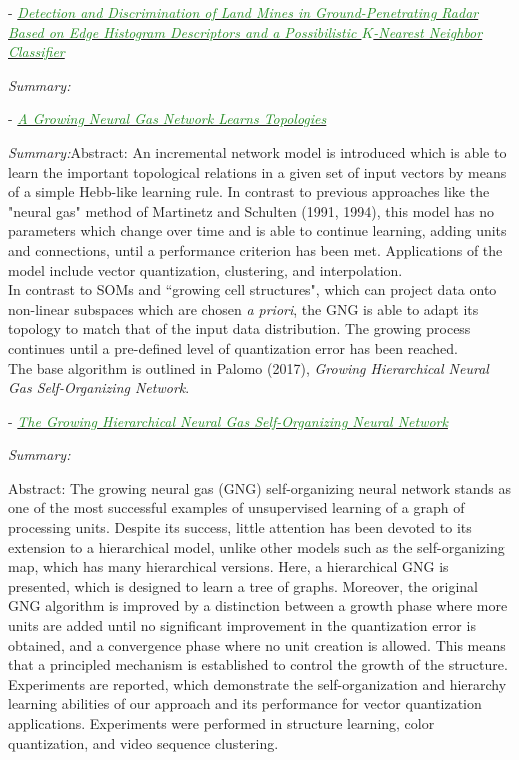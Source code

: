 \documentclass[]{article}
\newcommand{\paperentry}[4]{
            \hangindent=1cm
            \cite{#1} - \href{run:../References/#3}{\textcolor{ForestGreen}{\textit{#2}}}
            
            \noindent            
            \begin{minipage}[t]{0.1\linewidth}\hfill\end{minipage}
            \begin{minipage}[t]{0.8\linewidth}\textcolor{NavyBlue}{{\textit{Summary:}}}#4\end{minipage}
            \vspace{.25cm}
          }
\begin{document}
	\paperentry{Frigui2009LandmineSOM}
	{Detection and Discrimination of Land Mines in Ground-Penetrating Radar Based on Edge Histogram Descriptors and a Possibilistic $K$-Nearest Neighbor Classifier}
	{Manifold_Representation_Learning/CHL/Frigui2009LandmineSOM.pdf}
	{}
	
	\paperentry{Fritzke1995GrowingNeuralGas}
	{A Growing Neural Gas Network Learns Topologies}
	{Manifold_Representation_Learning/CHL/Fritzke1995GrowingNeuralGas.pdf}
	{Abstract: An incremental network model is introduced which is able to learn the important topological relations in a given set of input vectors by means of a simple Hebb-like learning rule. In contrast to previous approaches like the "neural gas" method of Martinetz and Schulten (1991, 1994), this model has no parameters which change over time and is able to continue learning, adding units and connections, until a performance criterion has been met. Applications of the model include vector quantization, clustering, and interpolation. \\
		
	\noindent
	In contrast to SOMs and ``growing cell structures", which can project data onto non-linear subspaces which are chosen \textit{a priori}, the GNG is able to adapt its topology to match that of the input data distribution.  The growing process continues until a pre-defined level of quantization error has been reached. \\
	
	\noindent
	The base algorithm is outlined in Palomo (2017), \textit{Growing Hierarchical Neural Gas Self-Organizing Network}.		
	}
	
	\paperentry{Palomo2017GHNG}
	{The Growing Hierarchical Neural Gas Self-Organizing Neural Network}
	{Manifold_Representation_Learning/CHL/Palomo2017GHNG.pdf}
	{}
	\newline
	Abstract: The growing neural gas (GNG) self-organizing neural network stands as one of the most successful examples of unsupervised learning of a graph of processing units. Despite its success, little attention has been devoted to its extension to a hierarchical model, unlike other models such as the self-organizing	map, which has many hierarchical versions. Here, a hierarchical GNG is presented, which is designed to learn a tree of graphs.  Moreover, the original GNG algorithm is improved by a distinction between a growth phase where more units are added until no significant improvement in the quantization error is obtained, and a convergence phase where no unit creation is	allowed. This means that a principled mechanism is established	to control the growth of the structure. Experiments are reported, which demonstrate the self-organization and hierarchy learning abilities of our approach and its performance for vector quantization	applications.  Experiments were performed in structure learning, color quantization, and video sequence clustering. \\
		
\end{document}

